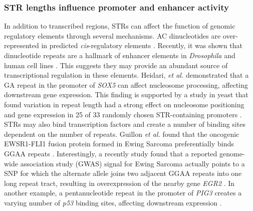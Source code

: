 \subsubsection{STR lengths influence promoter and enhancer activity}
In addition to transcribed regions, STRs can affect the function of genomic regulatory elements through several mechanisms. AC dinucleotides are over-represented in predicted \emph{cis}-regulatory elements \cite{RockmanWray2002}. Recently, it was shown that dinucleotide repeats are a hallmark of enhancer elements in \emph{Drosophila} and human cell lines \cite{Yanez-CunaArnoldStampfelEtAl2014}. This suggests they may provide an abundant source of transcriptional regulation in these elements. Heidari, \emph{et al.} \cite{HeidariNarimanSalehFamEsmaeilzadeh-GharehdaghiEtAl2012} demonstrated that a GA repeat in the promoter of \emph{SOX5} can affect nucleosome processing, affecting downstream gene expression. This finding is supported by a study in yeast that found variation in repeat length had a strong effect on nucleosome positioning and gene expression in 25 of 33 randomly chosen STR-containing promoters \cite{VincesLegendreCaldaraEtAl2009}. STRs may also bind transcription factors and create a number of binding sites dependent on the number of repeats. Guillon \emph{et al.} found that the oncogenic EWSR1-FLI1 fusion protein formed in Ewing Sarcoma preferentially binds GGAA repeats \cite{GuillonTirodeBoevaEtAl2009}. Interestingly, a recently study found that a reported genome-wide association study (GWAS) signal for Ewing Sarcoma actually points to a SNP for which the alternate allele joins two adjacent GGAA repeats into one long repeat tract, resulting in overexpression of the nearby gene \emph{EGR2} \cite{GrunewaldBernardGilardi-HebenstreitEtAl2015}. In another example, a pentanucleotide repeat in the promoter of \emph{PIG3} creates a varying number of \emph{p53} binding sites, affecting downstream expression \cite{ContenteDittmerKochEtAl2002}.


